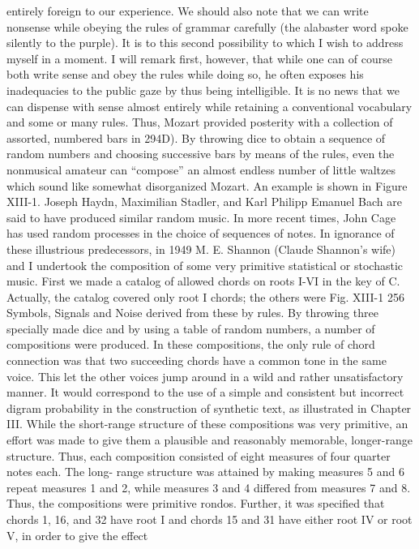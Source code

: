 {{{{{{{{{{{{entirely foreign to our experience. We should also note that we can
write nonsense while obeying the rules of grammar carefully (the
alabaster word spoke silently to the purple). It is to this second
possibility to which I wish to address myself in a moment. I will
remark first, however, that while one can of course both write
sense and obey the rules while doing so, he often exposes his
inadequacies to the public gaze by thus being intelligible.
It is no news that we can dispense with sense almost entirely
while retaining a conventional vocabulary and some or many rules.
Thus, Mozart provided posterity with a collection of assorted,
numbered bars in %
294D). By throwing dice to obtain a sequence of random numbers
and choosing successive bars by means of the rules, even the
nonmusical amateur can “compose” an almost endless number of
little waltzes which sound like somewhat disorganized Mozart. An
example is shown in Figure XIII-1. Joseph Haydn, Maximilian
Stadler, and Karl Philipp Emanuel Bach are said to have produced
similar random music. In more recent times, John Cage has used
random processes in the choice of sequences of notes.
In ignorance of these illustrious predecessors, in 1949 M. E.
Shannon (Claude Shannon’s wife) and I undertook the composition
of some very primitive statistical or stochastic music. First we
made a catalog of allowed chords on roots I-VI in the key of C.
Actually, the catalog covered only root I chords; the others were
Fig. XIII-1
256
Symbols, Signals and Noise
derived from these by rules. By throwing three specially made dice
and by using a table of random numbers, a number of compositions
were produced.
In these compositions, the only rule of chord connection was
that two succeeding chords have a common tone in the same voice.
This let the other voices jump around in a wild and rather unsatisfactory
manner. It would correspond to the use of a simple and
consistent but incorrect digram probability in the construction of
synthetic text, as illustrated in Chapter III.
While the short-range structure of these compositions was very
primitive, an effort was made to give them a plausible and reasonably
memorable, longer-range structure. Thus, each composition
consisted of eight measures of four quarter notes each. The long-
range structure was attained by making measures 5 and 6 repeat
measures 1 and 2, while measures 3 and 4 differed from measures
7 and 8. Thus, the compositions were primitive rondos. Further,
it was specified that chords 1, 16, and 32 have root I and chords
15 and 31 have either root IV or root V, in order to give the effect
}}}}}}}}}}}}
